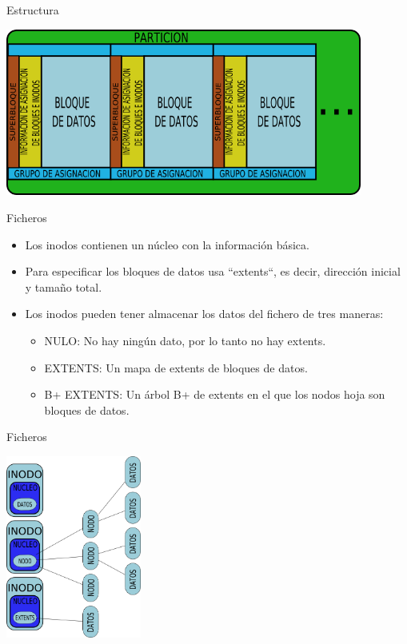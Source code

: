 \begin{frame}{Estructura}
  \begin{center}
    \includegraphics[height=5.5cm]{imgs/xfs_struct.png}
  \end{center}
\end{frame}

\begin{frame}{Ficheros}
  \begin{itemize}
    \item Los inodos contienen un núcleo con la información básica.
    \item Para especificar los bloques de datos usa ``extents``, es decir, dirección inicial y tamaño total.
    \item Los inodos pueden tener almacenar los datos del fichero de tres maneras:
    \begin{itemize}
      \item NULO: No hay ningún dato, por lo tanto no hay extents.
      \item EXTENTS: Un mapa de extents de bloques de datos.
      \item B+ EXTENTS: Un árbol B+ de extents en el que los nodos hoja son bloques de datos.
    \end{itemize}
  \end{itemize}
\end{frame}

\begin{frame}{Ficheros}
  \begin{center}
    \includegraphics[height=6cm]{imgs/xfs_files.png}
  \end{center}
\end{frame}
